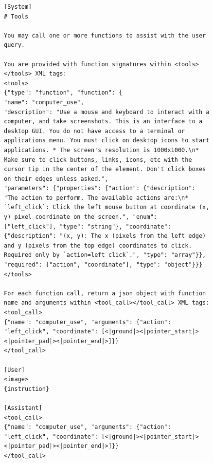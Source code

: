 \begin{figure}[t]
\begin{tcolorbox}[colback=white, width=\linewidth, breakable, enhanced, 
                  title=Prompt for the GUI-Owl-7B / GUI-Owl-1.5 Retrofit Model, fonttitle=\bfseries]
\lstset{
basicstyle=\scriptsize\ttfamily,
    columns=fullflexible,
    breaklines=true,
    breakatwhitespace=false,
    showstringspaces=false,
    lineskip=-1pt
}

\begin{lstlisting}
[System]
# Tools

You may call one or more functions to assist with the user query.

You are provided with function signatures within <tools></tools> XML tags:
<tools>
{"type": "function", "function": {
"name": "computer_use",
"description": "Use a mouse and keyboard to interact with a computer, and take screenshots. This is an interface to a desktop GUI. You do not have access to a terminal or applications menu. You must click on desktop icons to start applications. * The screen's resolution is 1000x1000.\n* Make sure to click buttons, links, icons, etc with the cursor tip in the center of the element. Don't click boxes on their edges unless asked.",
"parameters": {"properties": {"action": {"description": "The action to perform. The available actions are:\n* `left_click`: Click the left mouse button at coordinate (x, y) pixel coordinate on the screen.", "enum": ["left_click"], "type": "string"}, "coordinate": {"description": "(x, y): The x (pixels from the left edge) and y (pixels from the top edge) coordinates to click. Required only by `action=left_click`.", "type": "array"}}, "required": ["action", "coordinate"], "type": "object"}}}
</tools>

For each function call, return a json object with function name and arguments within <tool_call></tool_call> XML tags:
<tool_call>
{"name": "computer_use", "arguments": {"action": "left_click", "coordinate": [<|ground|><|pointer_start|><|pointer_pad|><|pointer_end|>]}}
</tool_call>

[User]
<image>
{instruction}

[Assistant]
<tool_call>
{"name": "computer_use", "arguments": {"action": "left_click", "coordinate": [<|ground|><|pointer_start|><|pointer_pad|><|pointer_end|>]}}
</tool_call>
\end{lstlisting}

\end{tcolorbox}
\end{figure}